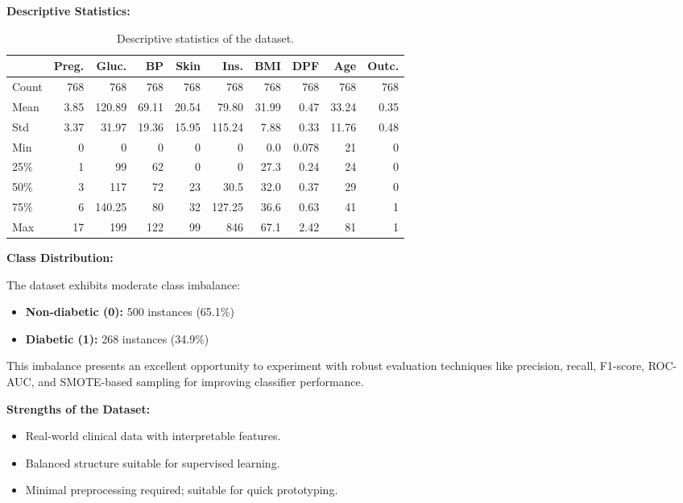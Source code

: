 \documentclass[conference]{IEEEtran}
\begin{document}
\vspace{0.5em}
\noindent\textbf{Descriptive Statistics:}

\begin{table}
\centering
\begin{tabular}{lrrrrrrrrr}
\toprule
& Preg. & Gluc. & BP & Skin & Ins. & BMI & DPF & Age & Outc. \\
\midrule
Count & 768 & 768 & 768 & 768 & 768 & 768 & 768 & 768 & 768 \\
Mean  & 3.85 & 120.89 & 69.11 & 20.54 & 79.80 & 31.99 & 0.47 & 33.24 & 0.35 \\
Std   & 3.37 & 31.97 & 19.36 & 15.95 & 115.24 & 7.88 & 0.33 & 11.76 & 0.48 \\
Min   & 0 & 0 & 0 & 0 & 0 & 0.0 & 0.078 & 21 & 0 \\
25\%  & 1 & 99 & 62 & 0 & 0 & 27.3 & 0.24 & 24 & 0 \\
50\%  & 3 & 117 & 72 & 23 & 30.5 & 32.0 & 0.37 & 29 & 0 \\
75\%  & 6 & 140.25 & 80 & 32 & 127.25 & 36.6 & 0.63 & 41 & 1 \\
Max   & 17 & 199 & 122 & 99 & 846 & 67.1 & 2.42 & 81 & 1 \\
\bottomrule
\end{tabular}
\caption{Descriptive statistics of the dataset.}
\label{tab:desc_stats}
\end{table}

\vspace{0.5em}
\noindent\textbf{Class Distribution:}

The dataset exhibits moderate class imbalance:
\begin{itemize}
    \item \textbf{Non-diabetic (0):} 500 instances (65.1\%)
    \item \textbf{Diabetic (1):} 268 instances (34.9\%)
\end{itemize}

This imbalance presents an excellent opportunity to experiment with robust evaluation techniques like precision, recall, F1-score, ROC-AUC, and SMOTE-based sampling for improving classifier performance.

\vspace{0.5em}
\noindent\textbf{Strengths of the Dataset:}
\begin{itemize}
    \item Real-world clinical data with interpretable features.
    \item Balanced structure suitable for supervised learning.
    \item Minimal preprocessing required; suitable for quick prototyping.
\end{itemize}
\end{document}
